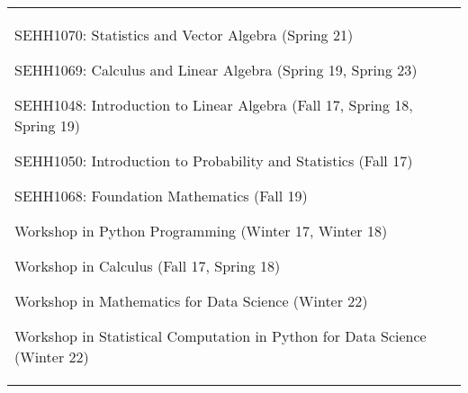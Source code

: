 \documentclass[10pt, oneside]{article}
\begin{document}
\begin{tabularx}{\linewidth}{p{2.2cm}|p{16cm}}
\begin{itemize}
{			\item SEHH1070: Statistics and Vector Algebra (Spring 21)
			\item SEHH1069: Calculus and Linear Algebra (Spring 19, Spring 23)
			\item SEHH1048: Introduction to Linear Algebra (Fall 17, Spring 18, Spring 19)
			\item SEHH1050: Introduction to Probability and Statistics (Fall 17)		
			\item SEHH1068: Foundation Mathematics (Fall 19)		
			\item Workshop in Python Programming (Winter 17, Winter 18)
			\item Workshop in Calculus (Fall 17, Spring 18)
			\item Workshop in Mathematics for Data Science (Winter 22)
			\item Workshop in Statistical Computation in Python for Data Science (Winter 22)
		}
	\end{itemize}

\end{tabularx}
\end{document}
